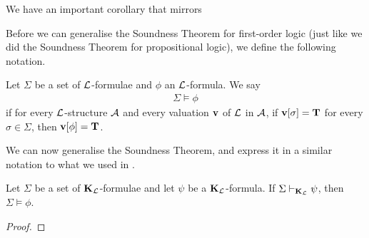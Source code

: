 We have an important corollary that mirrors \sorry %

Before we can generalise the Soundness Theorem for first-order logic (just like we did the Soundness Theorem for propositional logic), we define the following notation.

\begin{boxconvention}
    Let $\Sigma$ be a set of $\mathcal{L}$-formulae and $\phi$ an $\mathcal{L}$-formula. We say
    \begin{align*}
        \Sigma \models \phi
    \end{align*}
    if for every $\mathcal{L}$-structure $\mathcal{A}$ and every valuation $\mathbf{v}$ of $\mathcal{L}$ in $\mathcal{A}$, if $\mathbf{v}\!\left[ \sigma \right] = \mathbf{T}$ for every $\sigma \in \Sigma$, then $\mathbf{v}\!\left[ \phi \right] = \mathbf{T}$.
\end{boxconvention}

We can now generalise the Soundness Theorem, and express it in a similar notation to what we used in .

\begin{boxcorollary}
    Let $\Sigma$ be a set of $\mathbf{K}_{\mathcal{L}}$-formulae and let $\psi$ be a $\mathbf{K}_{\mathcal{L}}$-formula. If $\Sigma \vdash_{\mathbf{K}_{\mathcal{L}}} \psi$, then $\Sigma \models \phi$.
\end{boxcorollary}
\begin{proof}
    \sorry %
\end{proof}

